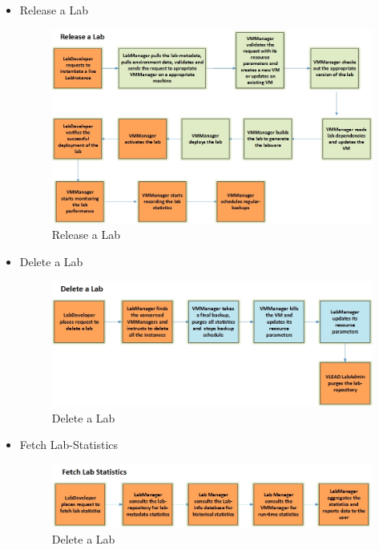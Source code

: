 \documentclass[11pt]{article}
\begin{document}
\begin{itemize}
\item Release a Lab\\
\label{sec-3.4.4}


\begin{figure}[htb]
\centering
\includegraphics[width=16cm]{Release-a-lab.jpg}
\caption{Release a Lab}
\end{figure}


\item Delete a Lab\\
\label{sec-3.4.5}


\begin{figure}[htb]
\centering
\includegraphics[width=16cm]{Delete-a-lab.jpg}
\caption{Delete a Lab}
\end{figure}


\item Fetch Lab-Statistics\\
\label{sec-3.4.6}


\begin{figure}[htb]
\centering
\includegraphics[width=16cm]{Fetch-lab-statistics.jpg}
\caption{Delete a Lab}
\end{figure}



\end{itemize}
\end{document}
